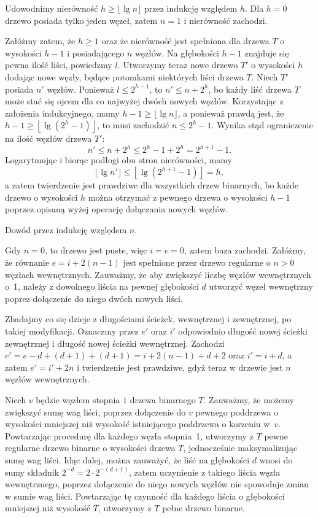 \exercise{} %
Udowodnimy nierówność $h\ge\lfloor\lg n\rfloor$ przez indukcję względem $h$. Dla $h=0$ drzewo posiada tylko jeden węzeł, zatem $n=1$ i nierówność zachodzi.

Załóżmy zatem, że $h\ge1$ oraz że nierówność jest spełniona dla drzewa $T$ o wysokości $h-1$ i posiadającego $n$ węzłów. Na głębokości $h-1$ znajduje się pewna ilość liści, powiedzmy $l$. Utworzymy teraz nowe drzewo $T'$ o wysokości $h$ dodając nowe węzły, będące potomkami niektórych liści drzewa $T$. Niech $T'$ posiada $n'$ węzłów. Ponieważ $l\le2^{h-1}$, to $n'\le n+2^h$, bo każdy liść drzewa $T$ może stać się ojcem dla co najwyżej dwóch nowych węzłów. Korzystając z założenia indukcyjnego, mamy $h-1\ge\lfloor\lg n\rfloor$, a ponieważ prawdą jest, że $h-1\ge\left\lfloor\lg(2^h-1)\right\rfloor$, to musi zachodzić $n\le 2^h-1$. Wynika stąd ograniczenie na ilość węzłów drzewa $T'$:
\[
	n' \le n+2^h \le 2^h-1+2^h = 2^{h+1}-1.
\]
Logarytmując i biorąc podłogi obu stron nierówności, mamy
\[
	\lfloor\lg n'\rfloor \le \left\lfloor\lg(2^{h+1}-1)\right\rfloor = h,
\]
a zatem twierdzenie jest prawdziwe dla wszystkich drzew binarnych, bo każde drzewo o wysokości $h$ można otrzymać z pewnego drzewa o wysokości $h-1$ poprzez opisaną wyżej operację dołączania nowych węzłów.

\exercise{} %
Dowód przez indukcję względem $n$.

Gdy $n=0$, to drzewo jest puste, więc $i=e=0$, zatem baza zachodzi. Załóżmy, że równanie $e=i+2(n-1)$ jest spełnione przez drzewo regularne o $n>0$ węzłach wewnętrznych. Zauważmy, że aby zwiększyć liczbę węzłów wewnętrznych o~1, należy z dowolnego liścia na pewnej głębokości $d$ utworzyć węzeł wewnętrzny poprez dołączenie do niego dwóch nowych liści.

Zbadajmy co się dzieje z długościami ścieżek, wewnętrznej i zewnętrznej, po takiej modyfikacji. Oznaczmy przez $e'$ oraz $i'$ odpowiednio długość nowej ścieżki zewnętrznej i długość nowej ścieżki wewnętrznej. Zachodzi $e'=e-d+(d+1)+(d+1)=i+2(n-1)+d+2$ oraz $i'=i+d$, a zatem $e'=i'+2n$ i twierdzenie jest prawdziwe, gdyż teraz w drzewie jest $n$ węzłów wewnętrznych.

\exercise{} %
Niech $v$ będzie węzłem stopnia $1$ drzewa binarnego $T$. Zauważmy, że możemy zwiększyć sumę wag liści, poprzez dołączenie do $v$ pewnego poddrzewa o wysokości mniejszej niż wysokość istniejącego poddrzewa o korzeniu w~$v$. Powtarzając procedurę dla każdego węzła stopnia~1, utworzymy z $T$ pewne regularne drzewo binarne o wysokości drzewa $T$, jednocześnie maksymalizując sumę wag liści. Idąc dalej, można zauważyć, że liść na głębokości $d$ wnosi do sumy składnik $2^{-d}=2\cdot2^{-(d+1)}$, zatem uczynienie z takiego liścia węzła wewnętrznego, poprzez dołączenie do niego nowych węzłów nie spowoduje zmian w sumie wag liści. Powtarzając tę czynność dla każdego liścia o głębokości mniejszej niż wysokość $T$, utworzymy z $T$ pełne drzewo binarne.

